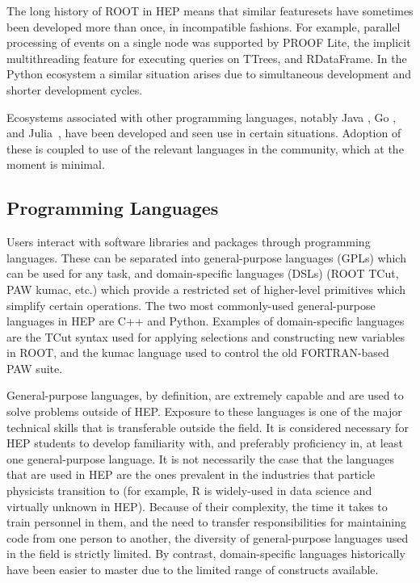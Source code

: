 The long history of ROOT in HEP means that similar featuresets have sometimes been developed more than once, in incompatible fashions. For example, parallel processing of events on a single node was supported by PROOF Lite, the implicit multithreading feature for executing queries on TTrees, and RDataFrame. In the Python ecosystem a similar situation arises due to simultaneous development and shorter development cycles.

Ecosystems associated with other programming languages, notably Java \cite{Chekanov:2020bja}, Go \cite{Binet:2018xcc}, and Julia~\cite{bezanson2017julia}, have been developed and seen use in certain situations. Adoption of these is coupled to use of the relevant languages in the community, which at the moment is minimal.

\subsection{Programming Languages}
Users interact with software libraries and packages through programming languages. These can be separated into general-purpose languages (GPLs) which can be used for any task, and domain-specific languages (DSLs) (ROOT TCut, PAW kumac, etc.) which provide a restricted set of higher-level primitives which simplify certain operations. The two most commonly-used general-purpose languages in HEP are C++ and Python. Examples of domain-specific languages are the TCut syntax used for applying selections and constructing new variables in ROOT, and the kumac language used to control the old FORTRAN-based PAW suite.

General-purpose languages, by definition, are extremely capable and are used to solve problems outside of HEP. Exposure to these languages is one of the major technical skills that is transferable outside the field. It is considered necessary for HEP students to develop familiarity with, and preferably proficiency in, at least one general-purpose language. It is not necessarily the case that the languages that are used in HEP are the ones prevalent in the industries that particle physicists transition to (for example, R is widely-used in data science and virtually unknown in HEP). Because of their complexity, the time it takes to train personnel in them, and the need to transfer responsibilities for maintaining code from one person to another, the diversity of general-purpose languages used in the field is strictly limited. By contrast, domain-specific languages historically have been easier to master due to the limited range of constructs available.


